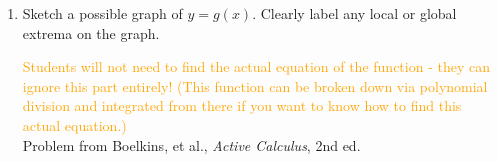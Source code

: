\documentclass{ximera}
\begin{document}
\begin{exercise}
\begin{enumerate}
        \item Sketch a possible graph of $y=g(x)$. Clearly label any local or global extrema on the graph.\\
        \begin{center}
        \end{center}
        \textcolor{orange}{Students will not need to find the actual equation of the function - they can ignore this part entirely! (This function can be broken down via polynomial division and integrated from there if you want to know how to find this actual equation.)}\\
    Problem from Boelkins, et al., \textit{Active Calculus}, 2nd ed.
    \end{enumerate}
\end{exercise}
\end{document}
